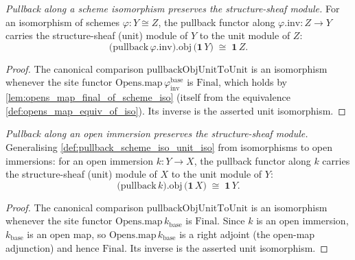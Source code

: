 \begin{definition}

  \label{def:pullback_scheme_iso_unit_iso}
  \textit{Pullback along a scheme isomorphism preserves the structure-sheaf module.}
  For an isomorphism of schemes \(\varphi : Y \cong Z\), the pullback functor along
  \(\varphi.\mathrm{inv} : Z \to Y\) carries the structure-sheaf (unit) module of \(Y\) to the unit
  module of \(Z\):
  \[
    \bigl(\mathrm{pullback}\,\varphi.\mathrm{inv}\bigr).\mathrm{obj}\,
      \bigl(\mathbf{1}\,Y\bigr) \;\cong\; \mathbf{1}\,Z .
  \]
\end{definition}
\begin{proof}
  The canonical comparison \(\mathrm{pullbackObjUnitToUnit}\) is an isomorphism whenever the site
  functor \(\mathrm{Opens.map}\,\varphi_{\mathrm{inv}}^{\mathrm{base}}\) is \(\mathrm{Final}\), which
  holds by \cref{lem:opens_map_final_of_scheme_iso} (itself from the equivalence
  \cref{def:opens_map_equiv_of_iso}). Its inverse is the asserted unit isomorphism.
\end{proof}

\begin{definition}

  \label{def:pullback_open_immersion_unit_iso}
  \textit{Pullback along an open immersion preserves the structure-sheaf module.}
  Generalising \cref{def:pullback_scheme_iso_unit_iso} from isomorphisms to open immersions: for an
  open immersion \(k : Y \to X\), the pullback functor along \(k\) carries the structure-sheaf (unit)
  module of \(X\) to the unit module of \(Y\):
  \[
    \bigl(\mathrm{pullback}\,k\bigr).\mathrm{obj}\,\bigl(\mathbf{1}\,X\bigr) \;\cong\; \mathbf{1}\,Y .
  \]
\end{definition}
\begin{proof}
  The canonical comparison \(\mathrm{pullbackObjUnitToUnit}\) is an isomorphism whenever the site functor
  \(\mathrm{Opens.map}\,k_{\mathrm{base}}\) is \(\mathrm{Final}\). Since \(k\) is an open immersion,
  \(k_{\mathrm{base}}\) is an open map, so \(\mathrm{Opens.map}\,k_{\mathrm{base}}\) is a right adjoint
  (the open-map adjunction) and hence \(\mathrm{Final}\). Its inverse is the asserted unit isomorphism.
\end{proof}

